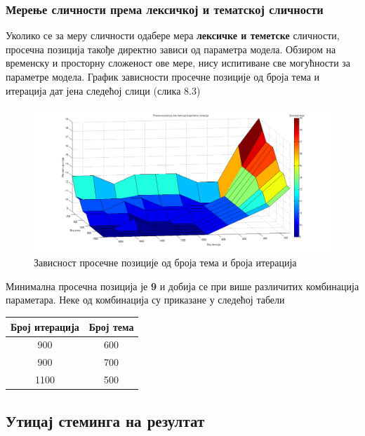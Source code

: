	\subsubsection{Мерење сличности према лексичкој и тематској сличности}
	
Уколико се за меру сличности одабере мера  \textbf{лексичке и теметске} сличности, просечна позиција такође директно зависи од параметра модела. Обзиром на временску и просторну сложеност ове мере, нису испитиване све могућности за параметре модела. График зависности просечне позиције од броја тема и итерација дат јена следећој слици (слика 8.3)

		\begin{figure}[H]
    \centering
   \includegraphics[scale=0.3]{./Slike/distnoStemNoSyn.png} 
	\caption{Зависност просечне позиције од броја тема и броја итерација}
	\label{fig:slika1}
\end{figure}

Минимална просечна позиција је \textbf{9} и добија се при више различитих комбинација параметара. Неке од комбинација су приказане у следећој табели

\begin{center}
\begin{tabular}{|c|c|}
\hline
Број итерација & Број тема \\
\hline\hline
900 & 600 \\
900 & 700 \\
1100 & 500 \\
\hline
\end{tabular}

\end{center}


\subsection{Утицај стеминга на резултат}

